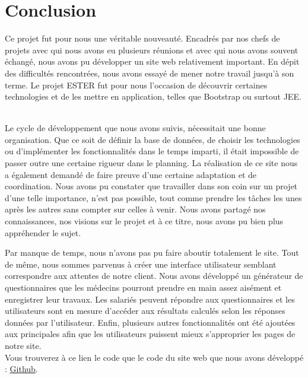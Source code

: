\chapter*{Conclusion}

Ce projet fut pour nous une véritable nouveauté. Encadrés par nos chefs de projets avec qui nous avons eu plusieurs réunions et avec qui nous avons souvent échangé, nous avons pu développer un site web relativement important. En dépit des difficultés rencontrées, nous avons essayé de mener notre travail jusqu'à son terme. Le projet ESTER fut pour nous l'occasion de découvrir certaines technologies et de les mettre en application, telles que Bootstrap ou surtout JEE. \ 

Le cycle de développement que nous avons suivis, nécessitait une bonne organisation. Que ce soit de définir la base de données, de choisir les technologies ou d'implémenter les fonctionnalités dans le temps imparti, il était impossible de passer outre une certaine rigueur dans le planning. La réalisation de ce site nous a également demandé de faire preuve d'une certaine adaptation et de coordination. Nous avons pu constater que travailler dans son coin sur un projet d'une telle importance, n'est pas possible, tout comme prendre les tâches les unes après les autres sans compter sur celles à venir. Nous avons partagé nos connaissances, nos visions sur le projet et à ce titre, nous avons pu bien plus appréhender le sujet. \

Par manque de temps, nous n'avons pas pu faire aboutir totalement le site. Tout de même, nous sommes parvenus à créer une interface utilisateur semblant correspondre aux attentes de notre client. Nous avons développé un générateur de questionnaires que les médecins pourront prendre en main assez aisément et enregistrer leur travaux. Les salariés peuvent répondre aux questionnaires et les utilisateurs sont en mesure d'accéder aux résultats calculés selon les réponses données par l'utilisateur. Enfin, plusieurs autres fonctionnalités ont été ajoutées aux principales afin que les utilisateurs puissent mieux s'approprier les pages de notre site. \\


Vous trouverez à ce lien le code que le code du site web que nous avons développé : \href{https://github.com/nordinaryguy/Projet_ESTER}{Github}.
